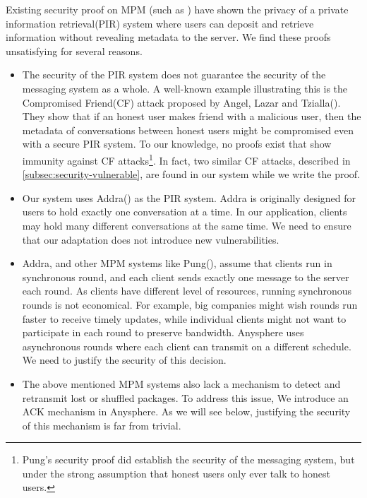 Existing security proof on MPM (such as \cite{corrigan2010dissent, corrigan2015riposte, angel2016unobservable, ahmad2021addra}) have shown the privacy of a private information retrieval(PIR) system where users can deposit and retrieve information without revealing metadata to the server. We find these proofs unsatisfying for several reasons.
\begin{itemize}
    \item The security of the PIR system does not guarantee the security of the messaging system as a whole. A well-known example illustrating this is the Compromised Friend(CF) attack proposed by Angel, Lazar and Tzialla(\cite{angel2018cf}). They show that if an honest user makes friend with a malicious user, then the metadata of conversations between honest users might be compromised even with a secure PIR system. To our knowledge, no proofs exist that show immunity against CF attacks\footnote{Pung's security proof \cite[Appendix C]{angel2018thesis} did establish the security of the messaging system, but under the strong assumption that honest users only ever talk to honest users.}. In fact, two similar CF attacks, described in \cref{subsec:security-vulnerable}, are found in our system while we write the proof. 
    
    \item Our system uses Addra(\cite{ahmad2021addra}) as the PIR system. Addra is originally designed for users to hold exactly one conversation at a time. In our application, clients may hold many different conversations at the same time. We need to ensure that our adaptation does not introduce new vulnerabilities.
    
    \item Addra, and other MPM systems like Pung(\cite{angel2016unobservable}), assume that clients run in synchronous round, and each client sends exactly one message to the server each round. As clients have different level of resources, running synchronous rounds is not economical. For example, big companies might wish rounds run faster to receive timely updates, while individual clients might not want to participate in each round to preserve bandwidth. Anysphere uses asynchronous rounds where each client can transmit on a different schedule. We need to justify the security of this decision.
    
    \item The above mentioned MPM systems also lack a mechanism to detect and retransmit lost or shuffled packages. To address this issue, We introduce an ACK mechanism in Anysphere. As we will see below, justifying the security of this mechanism is far from trivial.
\end{itemize}

